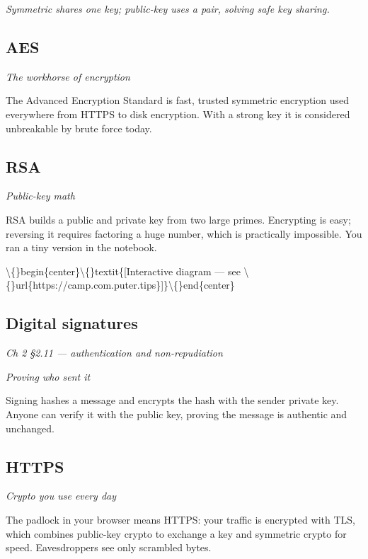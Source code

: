 \documentclass[12pt,openany]{book}
\begin{document}
{\small\itshape\color{gray}Symmetric shares one key; public-key uses a pair, solving safe key sharing.}

\medskip

\subsection*{AES}
{\small\itshape\color{gray}The workhorse of encryption}


The Advanced Encryption Standard is fast, trusted symmetric encryption used everywhere from HTTPS to disk encryption. With a strong key it is considered unbreakable by brute force today.

\medskip

\subsection*{RSA}
{\small\itshape\color{gray}Public-key math}


RSA builds a public and private key from two large primes. Encrypting is easy; reversing it requires factoring a huge number, which is practically impossible. You ran a tiny version in the notebook.


\textbackslash\{\}begin\{center\}\textbackslash\{\}textit\{[Interactive diagram --- see \textbackslash\{\}url\{https://camp.com.puter.tips\}]\}\textbackslash\{\}end\{center\}

\medskip

\subsection*{Digital signatures}
{\small\itshape\color{gray}Ch 2 §2.11 --- authentication and non-repudiation}

{\small\itshape\color{gray}Proving who sent it}


Signing hashes a message and encrypts the hash with the sender private key. Anyone can verify it with the public key, proving the message is authentic and unchanged.

\medskip

\subsection*{HTTPS}
{\small\itshape\color{gray}Crypto you use every day}


The padlock in your browser means HTTPS: your traffic is encrypted with TLS, which combines public-key crypto to exchange a key and symmetric crypto for speed. Eavesdroppers see only scrambled bytes.
\end{document}
